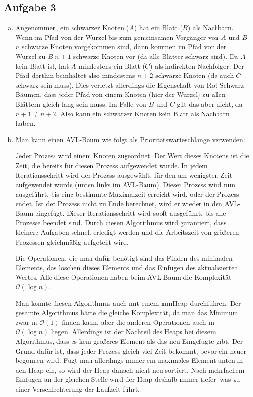 \documentclass[11pt]{article}
\begin{document}
\subsection*{Aufgabe 3}
\begin{enumerate}[a)]
  \item 
    Angenommen, ein schwarzer Knoten ($A$) hat ein Blatt ($B$) als Nachbarn.
    Wenn im Pfad von der Wurzel bis zum gemeinsamen Vorgänger von $A$ und $B$
    $n$ schwarze Knoten vorgekommen sind, dann kommen im Pfad von der Wurzel zu
    $B$ $n+1$ schwarze Knoten vor (da alle Blätter schwarz sind). Da $A$ kein
    Blatt ist, hat $A$ mindestens ein Blatt ($C$) als indirekten Nachfolger. Der
    Pfad dorthin beinhaltet also mindestens $n+2$ schwarze Knoten (da auch $C$
    schwarz sein muss). Dies verletzt allerdings die Eigenschaft von
    Rot-Schwarz-Bäumen, dass jeder Pfad von einem Knoten (hier der Wurzel) zu
    allen Blättern gleich lang sein muss. Im Falle von $B$ und $C$ gilt das aber
    nicht, da $n+1 \neq n+2$. Also kann ein schwarzer Knoten kein Blatt als
    Nachbarn haben.
  \item 
    Man kann einen AVL-Baum wie folgt als Prioritätswarteschlange verwenden:
    
    Jeder Prozess wird einem Knoten zugeordnet. Der Wert dieses Knotens ist die
    Zeit, die bereits für diesen Prozess aufgewendet wurde. In jedem
    Iterationsschritt wird der Prozess ausgewählt, für den am wenigsten Zeit
    aufgewendet wurde (unten links im AVL-Baum). Dieser Prozess wird nun
    ausgeführt, bis eine bestimmte Maximalzeit erreicht wird, oder der Prozess
    endet. Ist der Prozess nicht zu Ende berechnet, wird er wieder in den
    AVL-Baum eingefügt. Dieser Iterationsschritt wird sooft ausgeführt, bis alle
    Prozesse beendet sind. Durch diesen Algorithmus wird garantiert, dass
    kleinere Aufgaben schnell erledigt werden und die Arbeitszeit von größeren
    Prozessen gleichmäßig aufgeteilt wird.
    
    Die Operationen, die man dafür benötigt sind das Finden des minimalen
    Elements, das löschen dieses Elements und das Einfügen des aktualisierten
    Wertes. Alle diese Operationen haben beim AVL-Baum die Komplexität
    $\mathcal{O}(\log n)$.
    
    Man könnte diesen Algorithmus auch mit einem minHeap durchführen. Der
    gesamte Algorithmus hätte die gleiche Komplexität, da man das Minimum zwar
    in $\mathcal{O}(1)$ finden kann, aber die anderen Operationen auch in
    $\mathcal{O}(\log n)$ liegen. Allerdings ist der Nachteil des Heaps bei
    diesem Algorithmus, dass es kein größeres Element als das neu Eingefügte
    gibt. Der Grund dafür ist, dass jeder Prozess gleich viel Zeit bekommt,
    bevor ein neuer begonnen wird. Fügt man allerdings immer ein maximales
    Element unten in den Heap ein, so wird der Heap danach nicht neu sortiert.
    Nach mehrfachem Einfügen an der gleichen Stelle wird der Heap deshalb immer
    tiefer, was zu einer Verschlechterung der Laufzeit führt.
  \end{enumerate}
\end{document}
